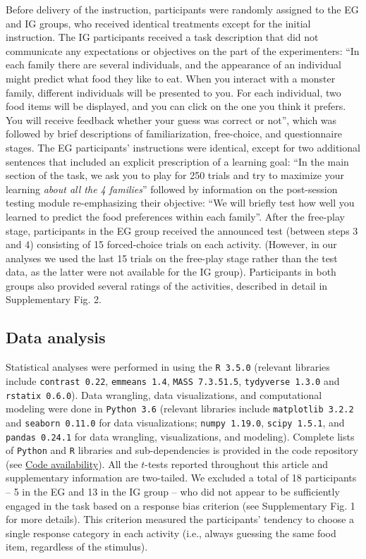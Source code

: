     Before delivery of the instruction, participants were randomly assigned to the EG and IG groups, who received identical treatments except for the initial instruction. The IG participants received a task description that did not communicate any expectations or objectives on the part of the experimenters: “In each family there are several individuals, and the appearance of an individual might predict what food they like to eat. When you interact with a monster family, different individuals will be presented to you. For each individual, two food items will be displayed, and you can click on the one you think it prefers. You will receive feedback whether your guess was correct or not”, which was followed by brief descriptions of familiarization, free-choice, and questionnaire stages. The EG participants’ instructions were identical, except for two additional sentences that included an explicit prescription of a learning goal: “In the main section of the task, we ask you to play for 250 trials and try to maximize your learning \textit{about all the 4 families}” followed by information on the post-session testing module re-emphasizing their objective: “We will briefly test how well you learned to predict the food preferences within each family”. After the free-play stage, participants in the EG group received the announced test (between steps 3 and 4) consisting of 15 forced-choice trials on each activity. (However, in our analyses we used the last 15 trials on the free-play stage rather than the test data, as the latter were not available for the IG group). Participants in both groups also provided several ratings of the activities, described in detail in Supplementary Fig. 2.
    
    \subsection*{Data analysis}\label{subsec:methods/analysis}
    Statistical analyses were performed in using the \texttt{R 3.5.0} (relevant libraries include \texttt{contrast 0.22}, \texttt{emmeans 1.4}, \texttt{MASS 7.3.51.5}, \texttt{tydyverse 1.3.0} and \texttt{rstatix 0.6.0}). Data wrangling, data visualizations, and computational modeling were done in \texttt{Python 3.6} (relevant libraries include \texttt{matplotlib 3.2.2} and \texttt{seaborn 0.11.0} for data visualizations; \texttt{numpy 1.19.0}, \texttt{scipy 1.5.1}, and \texttt{pandas 0.24.1} for data wrangling, visualizations, and modeling). Complete lists of \texttt{Python} and \texttt{R} libraries and sub-dependencies is provided in the code repository (see \hyperref[section:code_availability]{Code availability}). All the $t$-tests reported throughout this article and supplementary information are two-tailed. We excluded a total of 18 participants -- 5 in the EG and 13 in the IG group -- who did not appear to be sufficiently engaged in the task based on a response bias criterion (see Supplementary Fig. 1 for more details). This criterion measured the participants' tendency to choose a single response category in each activity (i.e., always guessing the same food item, regardless of the stimulus).
         
